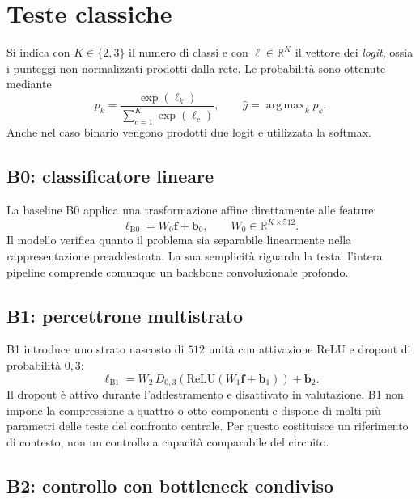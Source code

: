 \section{Teste classiche}
\label{sec:teste-classiche}

Si indica con \(K\in\{2,3\}\) il numero di classi e con
\(\boldsymbol{\ell}\in\mathbb{R}^{K}\) il vettore dei \emph{logit},
ossia i punteggi non normalizzati prodotti dalla rete. Le probabilità
sono ottenute mediante
\begin{equation}
  p_k=\frac{\exp(\ell_k)}{\sum_{c=1}^{K}\exp(\ell_c)},
  \qquad \widehat y=\mathop{\mathrm{arg\,max}}_k p_k.
  \label{eq:softmax-modelli}
\end{equation}
Anche nel caso binario vengono prodotti due logit e utilizzata la softmax.

\subsection{B0: classificatore lineare}

La baseline B0 applica una trasformazione affine direttamente alle
feature:
\begin{equation}
  \boldsymbol{\ell}_{\mathrm{B0}}
  =W_0\boldsymbol f+\boldsymbol b_0,
  \qquad W_0\in\mathbb{R}^{K\times512}.
\end{equation}
Il modello verifica quanto il problema sia separabile linearmente nella
rappresentazione preaddestrata. La sua semplicità riguarda la testa:
l'intera pipeline comprende comunque un backbone convoluzionale profondo.

\subsection{B1: percettrone multistrato}

B1 introduce uno strato nascosto di \(512\) unità con attivazione ReLU
e dropout di probabilità \(0{,}3\):
\begin{equation}
  \boldsymbol{\ell}_{\mathrm{B1}}
  =W_2\,D_{0{,}3}\!\left(\mathrm{ReLU}
    (W_1\boldsymbol f+\boldsymbol b_1)\right)+\boldsymbol b_2.
\end{equation}
Il dropout è attivo durante l'addestramento e disattivato in valutazione.
B1 non impone la compressione a quattro o otto componenti e dispone
di molti più parametri delle teste del confronto centrale. Per questo
costituisce un riferimento di contesto, non un controllo a capacità
comparabile del circuito.

\subsection{B2: controllo con bottleneck condiviso}

